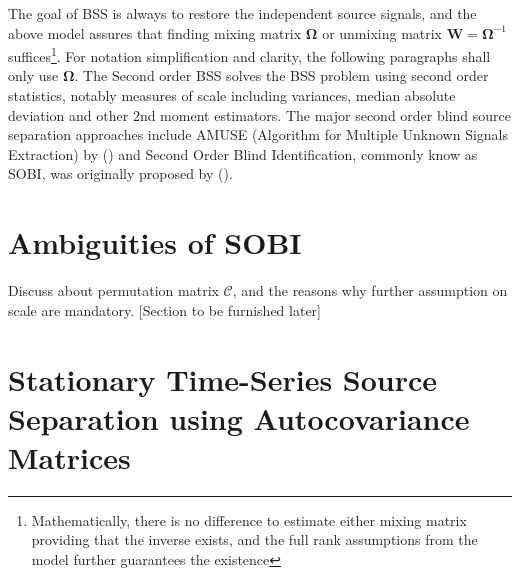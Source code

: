 \documentclass[utf8,english]{gradu3}
\begin{document}
The goal of BSS is always to restore the independent source signals, and the above model assures that finding mixing matrix $\boldsymbol{\Omega}$ or unmixing matrix $\boldsymbol{W}= \boldsymbol{\Omega}^{-1}$ suffices\footnote{Mathematically, there is no difference to estimate either mixing matrix providing that the inverse exists, and the full rank assumptions from the model further guarantees the existence}. For notation simplification and clarity, the following paragraphs shall only use $\boldsymbol\Omega$. The Second order BSS solves the BSS problem using second order statistics, notably measures of scale including variances, median absolute deviation and other 2nd moment estimators. The major second order blind source separation approaches include AMUSE (Algorithm for Multiple Unknown Signals Extraction) by \citeauthor{tong1990amuse} (\citeyear{tong1990amuse}) and Second Order Blind Identification, commonly know as SOBI, was originally proposed by \citeauthor{belouchrani1997blind} (\citeyear{belouchrani1997blind}).

\section{Ambiguities of SOBI}

Discuss about permutation matrix $\mathcal C$, and the reasons why further assumption on scale are mandatory. [Section to be furnished later]

\section{Stationary Time-Series Source Separation using Autocovariance Matrices}
\end{document}
